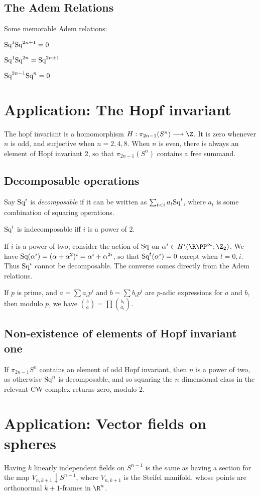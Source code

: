 \documentclass[11pt]{article}
\begin{document}
\subsection{The Adem Relations}
Some memorable Adem relations:
\begin{itemise}
\item $\textup{Sq}^1\textup{Sq}^{2n+1}=0$
\item $\textup{Sq}^1\textup{Sq}^{2n}=\textup{Sq}^{2n+1}$
\item $\textup{Sq}^{2n-1}\textup{Sq}^{n}=0$
\end{itemise}
\section{Application: The Hopf invariant}
The hopf invariant is a homomorphism $H:\pi_{2n-1}(S^n)\to\Z$. It is zero whenever $n$ is odd, and surjective when $n=2,4,8$. When $n$ is even, there is always an element of Hopf invariant $2$, so that $\pi_{2n-1}(S^n)$ contains a free summand.
\setcounter{subsection}{1}
\subsection{Decomposable operations}
Say $\textup{Sq}^i$ is \emph{decomposable} if it can be written as $\sum_{t<i}a_t\textup{Sq}^t$, where $a_t$ is some combination of squaring operations.
\begin{thm*}
$\textup{Sq}^i$ is indecomposable iff $i$ is a power of $2$.
\end{thm*}
If $i$ is a power of two, consider the action of $\textup{Sq}$ on $\alpha^i\in H^i(\RP^\infty;\Z_2)$. We have $\textup{Sq}(\alpha^i)=(\alpha+\alpha^2)^i=\alpha^i+\alpha^{2i}$, so that $\textup{Sq}^t(\alpha^i)=0$ except when $t=0,i$. Thus $\textup{Sq}^i$ cannot be decomposable. The converse comes directly from the Adem relations.
\begin{lem*}
If $p$ is prime, and $a=\sum a_ip^i$ and $b=\sum b_ip^i$ are $p$-adic expressions for $a$ and $b$, then modulo $p$, we have $\binom{b}{a}=\prod\binom{b_i}{a_i}$.
\end{lem*}
\subsection{Non-existence of elements of Hopf invariant one}
If $\pi_{2n-1}S^n$ contains an element of odd Hopf invariant, then $n$ is a power of two, as otherwise $\textup{Sq}^n$ is decomposable, and so squaring the $n$ dimensional class in the relevant CW complex returns zero, modulo 2.

\section{Application: Vector fields on spheres}
Having $k$ linearly independent fields on $S^{n-1}$ is the same as having a section for the map $V_{n,k+1}\downarrow S^{n-1}$, where $V_{n,k+1}$ is the Steifel manifold, whose points are orthonormal $k+1$-frames in $\R^n$. 
\end{document}
